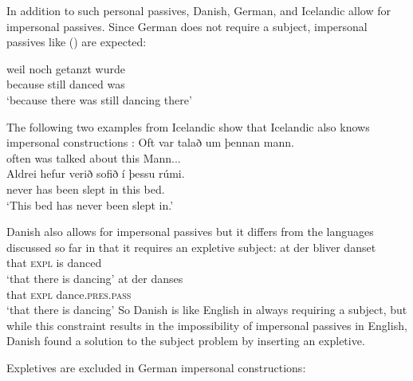 In addition to such personal passives, Danish, German, and Icelandic allow for impersonal
passives. Since German does not require a subject, impersonal passives like () are expected:

\ea
\gll weil noch getanzt wurde\\
     because still danced was\\\german
\glt `because there was still dancing there'
\z

The following two examples from Icelandic show that Icelandic also knows impersonal constructions \citep[]{Thrainsson2007a-u}:
\eal
\ex 
\gll Oft var   talað      um   þennan mann.\\
     often was talked about this Mann.\ACC.\SG.\M\\\icelandic
\ex
\gll Aldrei hefur verið    sofið      í  þessu  rúmi.\\
     never    has   been slept in this bed.\DAT\\
\glt `This bed has never been slept in.'
\zl

Danish also allows for impersonal passives but it differs from the languages discussed so far in
that it requires an expletive subject:
\eal
\ex 
\gll at der bliver danset\\
     that \textsc{expl} is danced\\
\glt `that there is dancing'
\ex
\gll at der danses\\
     that \textsc{expl} dance.\textsc{pres}.\textsc{pass}\\
\glt `that there is dancing'
\zl
So Danish is like English in always requiring a subject, but while this constraint results in the
impossibility of impersonal passives in English, Danish found a solution to the subject problem by
inserting an expletive.

Expletives are excluded in German impersonal constructions:
\nocite{MOe2011a}
\z




